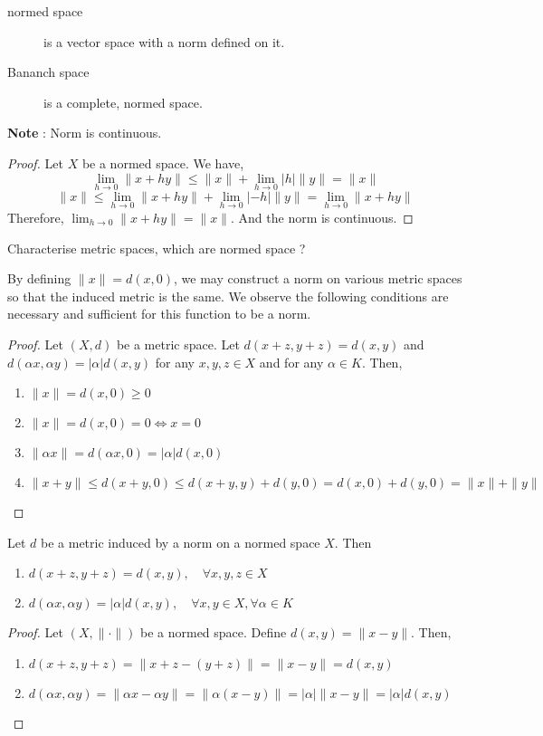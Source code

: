 \begin{description}
	\item[normed space] is a vector space with a norm defined on it.
	\item[Bananch space] is a complete, normed space.
\end{description}

\textbf{Note} : Norm is continuous.
\begin{proof}
	Let $X$ be a normed space.
	We have,
	\[ \lim_{h \to 0} \| x+hy \| \le \| x \| + \lim_{h \to 0} |h| \| y \| = \| x \| \]
	\[ \| x \| \le \lim_{h \to 0} \|x+hy\| + \lim_{h \to 0}|-h| \|y\| = \lim_{h \to 0} \| x+hy \| \]
	Therefore, $\displaystyle \lim_{h \to 0} \|x +hy \| = \| x \|$.
	And the norm is continuous.
\end{proof}

\begin{challenge}
	Characterise metric spaces, which are normed space ?\\
\end{challenge}
\begin{commentary}
	By defining $\|x\| = d(x,0)$, we may construct a norm on various metric spaces so that the induced metric is the same.
	We observe the following conditions are necessary and sufficient for this function to be a norm.
\begin{proof}
	Let $(X,d)$ be a metric space.
	Let $d(x+z,y+z) = d(x,y)$ and $d(\alpha x,\alpha y) = |\alpha|d(x,y)$ for any $x,y,z \in X$ and for any $\alpha \in K$.
	Then,
	\begin{enumerate}
		\item $ \| x \| = d(x,0) \ge 0 $
		\item $ \| x \| = d(x,0) = 0 \iff x = 0 $
		\item $ \| \alpha x \| = d(\alpha x,0) = |\alpha|d(x,0) $
		\item $ \| x+y \| \le d(x+y,0) \le d(x+y,y)+d(y,0) = d(x,0) + d(y,0) = \|x\| + \|y\| $
	\end{enumerate}
\end{proof}
\end{commentary}
\begin{lemma}
	Let $d$ be a metric induced by a norm on a normed space $X$.
	Then
	\begin{enumerate}
		\item $d(x+z,y+z) = d(x,y), \quad \forall x,y,z \in X$
		\item $d(\alpha x,\alpha y) = |\alpha| d(x,y),\quad \forall x,y \in X, \forall \alpha \in K$
	\end{enumerate}
\end{lemma}
\begin{proof}
	Let $(X,\| \cdot \|)$ be a normed space.
	Define $d(x,y) = \| x-y \|$.
	Then,
	\begin{enumerate}
		\item $ d(x+z,y+z) = \| x+z-(y+z) \| = \| x-y \| = d(x,y)$
		\item $ d(\alpha x, \alpha y) = \| \alpha x - \alpha y \| = \| \alpha (x-y) \| = |\alpha| \| x-y \| = |\alpha|d(x,y)$
	\end{enumerate}
\end{proof}
